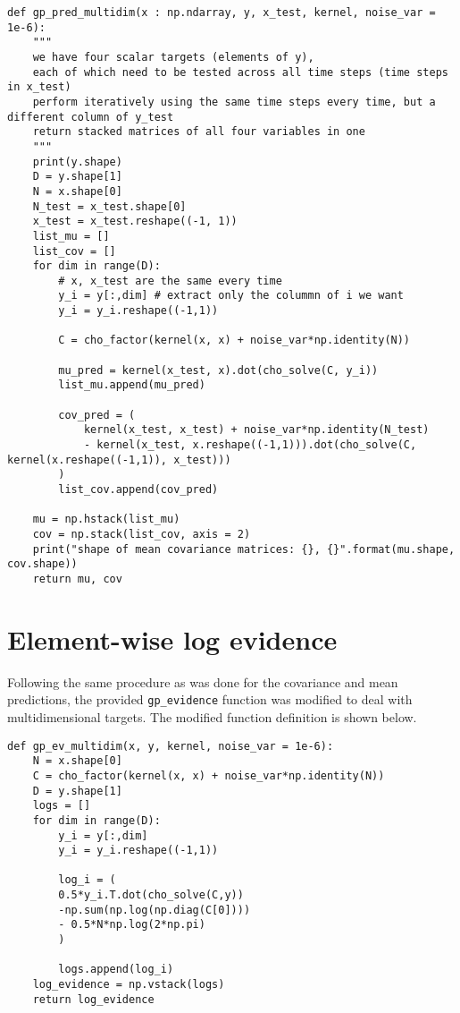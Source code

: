 \documentclass{article}
\begin{document}
\begin{verbatim}
def gp_pred_multidim(x : np.ndarray, y, x_test, kernel, noise_var = 1e-6):
    """
    we have four scalar targets (elements of y),
    each of which need to be tested across all time steps (time steps in x_test)
    perform iteratively using the same time steps every time, but a different column of y_test
    return stacked matrices of all four variables in one
    """
    print(y.shape)
    D = y.shape[1]
    N = x.shape[0]
    N_test = x_test.shape[0]
    x_test = x_test.reshape((-1, 1))
    list_mu = []
    list_cov = []
    for dim in range(D):
        # x, x_test are the same every time
        y_i = y[:,dim] # extract only the colummn of i we want
        y_i = y_i.reshape((-1,1))
        
        C = cho_factor(kernel(x, x) + noise_var*np.identity(N))
        
        mu_pred = kernel(x_test, x).dot(cho_solve(C, y_i))
        list_mu.append(mu_pred)
        
        cov_pred = (
            kernel(x_test, x_test) + noise_var*np.identity(N_test)
            - kernel(x_test, x.reshape((-1,1))).dot(cho_solve(C, kernel(x.reshape((-1,1)), x_test)))
        )
        list_cov.append(cov_pred)
    
    mu = np.hstack(list_mu)
    cov = np.stack(list_cov, axis = 2)
    print("shape of mean covariance matrices: {}, {}".format(mu.shape, cov.shape))
    return mu, cov
\end{verbatim}


\section{Element-wise log evidence}
Following the same procedure as was done for the covariance and mean predictions, the provided \verb+gp_evidence+ function was modified to deal with multidimensional targets. The modified function definition is shown below.

\begin{verbatim}
def gp_ev_multidim(x, y, kernel, noise_var = 1e-6):
    N = x.shape[0]
    C = cho_factor(kernel(x, x) + noise_var*np.identity(N))    
    D = y.shape[1]
    logs = []
    for dim in range(D):
        y_i = y[:,dim]
        y_i = y_i.reshape((-1,1))
        
        log_i = (
        0.5*y_i.T.dot(cho_solve(C,y))
        -np.sum(np.log(np.diag(C[0])))
        - 0.5*N*np.log(2*np.pi)
        )
        
        logs.append(log_i)
    log_evidence = np.vstack(logs)
    return log_evidence
\end{verbatim}
\end{document}
